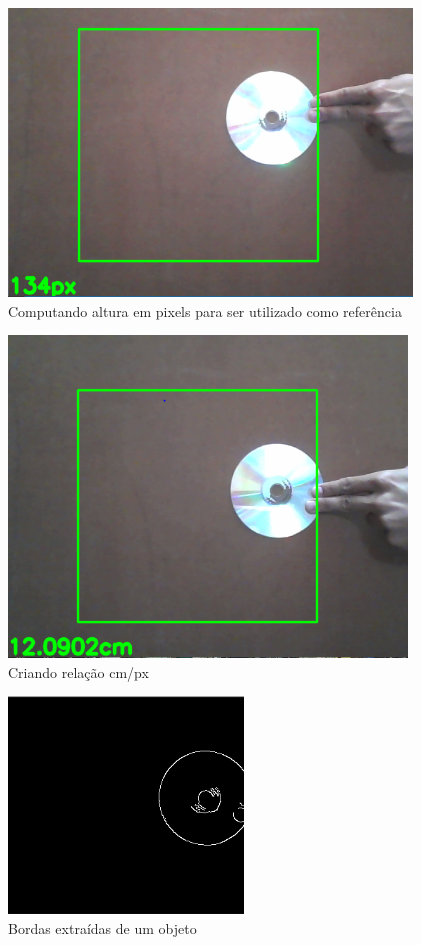 \documentclass[12pt]{article}
\begin{document}
	\begin{figure}[hh!]
		\centering
		\includegraphics[width=0.7\linewidth]{img/F4}
		\caption{ Computando altura em pixels para ser utilizado como referência}
		\label{fig:f4}
	\end{figure}

	
	\begin{figure}[hh!]
		\centering
		\includegraphics[width=0.7\linewidth]{img/F5}
		\caption{Criando relação cm/px}
		\label{fig:f5}
	\end{figure}
	
	\begin{figure}[hh!]
		\centering
		\includegraphics[width=0.4\linewidth]{img/F6}
		\caption{Bordas extraídas de um objeto}
		\label{fig:f6}
	\end{figure}
	
\end{document}
